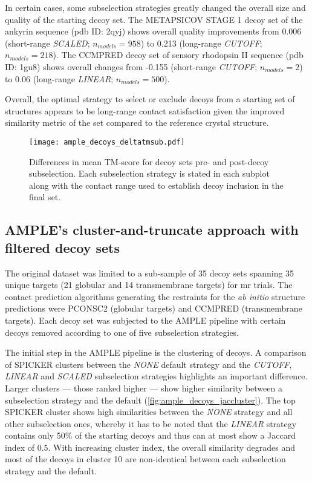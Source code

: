 In certain cases, some subselection strategies greatly changed the overall size and quality of the starting decoy set. The METAPSICOV STAGE 1 decoy set of the ankyrin sequence (\gls{pdb} ID: 2qyj) shows overall quality improvements from 0.006 (short-range \textit{SCALED}; $n_{models}=958$) to 0.213 (long-range \textit{CUTOFF}; $n_{models}=218$). The CCMPRED decoy set of sensory rhodopsin II sequence (\gls{pdb} ID: 1gu8) shows overall changes from -0.155 (short-range \textit{CUTOFF}; $n_{models}=2$) to 0.06 (long-range \textit{LINEAR}; $n_{models}=500$).

Overall, the optimal strategy to select or exclude decoys from a starting set of structures appears to be long-range contact satisfaction given the improved similarity metric of the set compared to the reference crystal structure. 

\begin{figure}[H]
	\centering
	\texttt{[image: ample\_decoys\_deltatmsub.pdf]}
        \caption[TM-score comparison pre- and post-decoy subselection]{Differences in mean TM-score  for decoy sets pre- and post-decoy subselection. Each subselection strategy is stated in each subplot along with the contact range used to establish decoy inclusion in the final set.}
	\label{fig:ample_decoys_deltatmsub}
\end{figure}

\subsection{AMPLE's cluster-and-truncate approach with filtered decoy sets}
The original dataset was limited to a sub-sample of 35 decoy sets spanning 35 unique targets (21 globular and 14 transmembrane targets) for \gls{mr} trials. The contact prediction algorithms generating the restraints for the \textit{ab initio} structure predictions were PCONSC2 (globular targets) and CCMPRED (transmembrane targets). Each decoy set was subjected to the AMPLE pipeline with certain decoys removed according to one of five subselection strategies.

The initial step in the AMPLE pipeline is the clustering of decoys. A comparison of SPICKER clusters between the \textit{NONE} default strategy and the \textit{CUTOFF}, \textit{LINEAR} and \textit{SCALED} subselection strategies highlights an important difference. Larger clusters --- those ranked higher --- show higher similarity between a subselection strategy and the default (\cref{fig:ample_decoys_jaccluster}). The top SPICKER cluster shows high similarities between the \textit{NONE} strategy and all other subselection ones, whereby it has to be noted that the \textit{LINEAR} strategy contains only 50\% of the starting decoys and thus can at most show a Jaccard index of 0.5. With increasing cluster index, the overall similarity degrades and most of the decoys in cluster 10 are non-identical between each subselection strategy and the default. 

